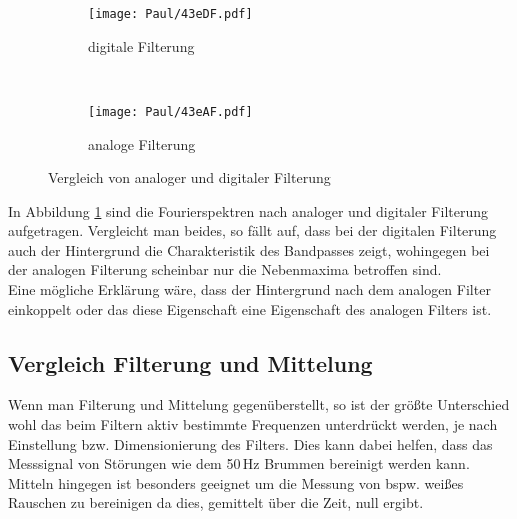 \begin{figure}[h]
    \centering
    \begin{subfigure}{0.9\textwidth}
        \centering
        \texttt{[image: Paul/43eDF.pdf]}
        \caption{digitale Filterung}
    \end{subfigure}
    \\
    \begin{subfigure}{0.9\textwidth}
        \centering
        \texttt{[image: Paul/43eAF.pdf]}
        \caption{analoge Filterung}
    \end{subfigure}
    \caption{Vergleich von analoger und digitaler Filterung}
    \label{fig:43e}
\end{figure}
\newpage
In Abbildung \ref{fig:43e} sind die Fourierspektren nach analoger und digitaler Filterung aufgetragen. Vergleicht man beides, so fällt auf, dass bei der digitalen Filterung auch der Hintergrund die Charakteristik des Bandpasses zeigt, wohingegen bei der analogen Filterung scheinbar nur die Nebenmaxima betroffen sind.\\
Eine mögliche Erklärung wäre, dass der Hintergrund nach dem analogen Filter einkoppelt oder das diese Eigenschaft eine Eigenschaft des analogen Filters ist.


\subsection{Vergleich Filterung und Mittelung}
Wenn man Filterung und Mittelung gegenüberstellt, so ist der größte Unterschied wohl das beim Filtern aktiv bestimmte Frequenzen unterdrückt werden, je nach Einstellung bzw. Dimensionierung des Filters. Dies kann dabei helfen, dass das Messsignal von Störungen wie dem 50\,Hz Brummen bereinigt werden kann.\\
Mitteln hingegen ist besonders geeignet um die Messung von bspw. weißes Rauschen zu bereinigen da dies, gemittelt über die Zeit, null ergibt.